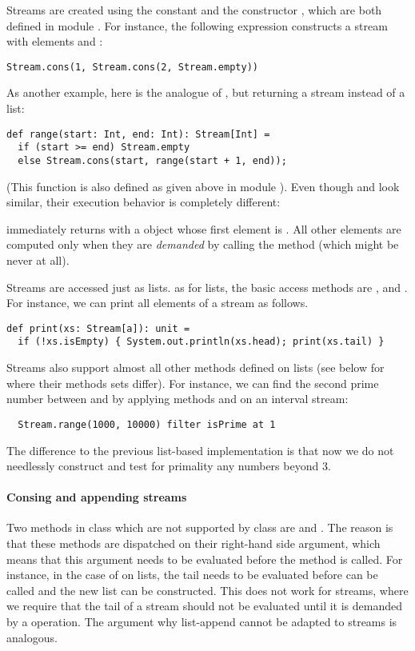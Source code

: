 \documentclass[a4paper,12pt,twoside,titlepage]{book}
\begin{document}
{Streams are created using the constant  and the constructor ,
which are both defined in module . For instance, the following
expression constructs a stream with elements  and :
\begin{lstlisting}
Stream.cons(1, Stream.cons(2, Stream.empty))
\end{lstlisting}
As another example, here is the analogue of ,
but returning a stream instead of a list:
\begin{lstlisting}
def range(start: Int, end: Int): Stream[Int] = 
  if (start >= end) Stream.empty
  else Stream.cons(start, range(start + 1, end));
\end{lstlisting}
(This function is also defined as given above in module
).  Even though  and 
look similar, their execution behavior is completely different: 

 immediately returns with a  object
whose first element is .  All other elements are computed
only when they are \emph{demanded} by calling the  method
(which might be never at all).  

Streams are accessed just as lists. as for lists, the basic access
methods are ,  and . For instance,
we can print all elements of a stream as follows.
\begin{lstlisting}
def print(xs: Stream[a]): unit = 
  if (!xs.isEmpty) { System.out.println(xs.head); print(xs.tail) }
\end{lstlisting}
Streams also support almost all other methods defined on lists (see
below for where their methods sets differ). For instance, we can find
the second prime number between  and  by applying methods
 and  on an interval stream:
\begin{lstlisting}
  Stream.range(1000, 10000) filter isPrime at 1
\end{lstlisting}
The difference to the previous list-based implementation is that now
we do not needlessly construct and test for primality any numbers
beyond 3.

\paragraph{Consing and appending streams} Two methods in class 
which are not supported by class  are \code{::} and
\code{:::}.  The reason is that these methods are dispatched on their
right-hand side argument, which means that this argument needs to be
evaluated before the method is called. For instance, in the case of
 on lists, the tail  needs to be evaluated
before \code{::} can be called and the new list can be constructed.
This does not work for streams, where we require that the tail of a
stream should not be evaluated until it is demanded by a  operation.
The argument why list-append \code{:::} cannot be adapted to streams is analogous.

}
\end{document}
